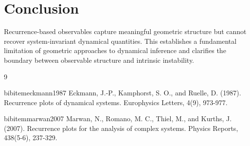 \documentclass[11pt]{article}
\begin{document}
\section{Conclusion}

Recurrence-based observables capture meaningful geometric structure but cannot recover system-invariant dynamical quantities. This establishes a fundamental limitation of geometric approaches to dynamical inference and clarifies the boundary between observable structure and intrinsic instability.

\begin{thebibliography}{9}

	bibitem{eckmann1987} Eckmann, J.-P., Kamphorst, S. O., and Ruelle, D. (1987). Recurrence plots of dynamical systems. Europhysics Letters, 4(9), 973-977.

	bibitem{marwan2007} Marwan, N., Romano, M. C., Thiel, M., and Kurths, J. (2007). Recurrence plots for the analysis of complex systems. Physics Reports, 438(5-6), 237-329.

\end{thebibliography}
\end{document}
